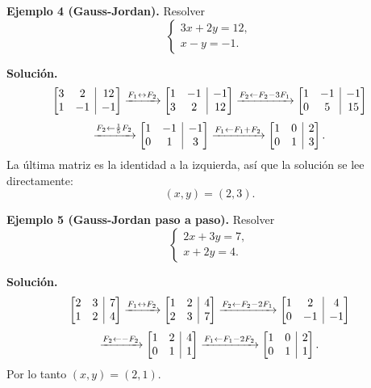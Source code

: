 \documentclass[12pt, letterpaper]{article}
\makeatletter
\newcommand{\mwaug}[2]{\ensuremath{\left[\begin{array}{@{}#1@{}}#2\end{array}\right]}}
\makeatother
\begin{document}
\begin{cuadrosolucion}
  \small
  \textbf{Ejemplo 4 (Gauss-Jordan).} Resolver
  \[
    \begin{cases}
      3x+2y=12,\\
      x-y=-1.
    \end{cases}
  \]

  \medskip
  \textbf{Solución.}
  \[
    \mwaug{cc|c}{3&2&12\\1&-1&-1}
    \xrightarrow{F_1\leftrightarrow F_2}
    \mwaug{cc|c}{1&-1&-1\\3&2&12}
    \xrightarrow{F_2\leftarrow F_2-3F_1}
    \mwaug{cc|c}{1&-1&-1\\0&5&15}
  \]
  \[
    \xrightarrow{F_2\leftarrow \frac15F_2}
    \mwaug{cc|c}{1&-1&-1\\0&1&3}
    \xrightarrow{F_1\leftarrow F_1+F_2}
    \mwaug{cc|c}{1&0&2\\0&1&3}.
  \]
  La última matriz es la identidad a la izquierda, así que la solución se
  lee directamente:
  \[
    (x,y)=(2,3).
  \]
\end{cuadrosolucion}

\begin{cuadrosolucion}
  \small
  \textbf{Ejemplo 5 (Gauss-Jordan paso a paso).} Resolver
  \[
    \begin{cases}
      2x+3y=7,\\
      x+2y=4.
    \end{cases}
  \]

  \medskip
  \textbf{Solución.}
  \[
    \mwaug{cc|c}{2&3&7\\1&2&4}
    \xrightarrow{F_1\leftrightarrow F_2}
    \mwaug{cc|c}{1&2&4\\2&3&7}
    \xrightarrow{F_2\leftarrow F_2-2F_1}
    \mwaug{cc|c}{1&2&4\\0&-1&-1}
  \]
  \[
    \xrightarrow{F_2\leftarrow -F_2}
    \mwaug{cc|c}{1&2&4\\0&1&1}
    \xrightarrow{F_1\leftarrow F_1-2F_2}
    \mwaug{cc|c}{1&0&2\\0&1&1}.
  \]
  Por lo tanto $(x,y)=(2,1)$.
\end{cuadrosolucion}
\end{document}
